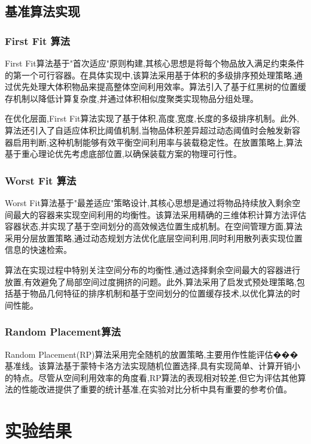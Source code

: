 \documentclass[UTF8]{ctexart}
\begin{document}
\subsection{基准算法实现}

\subsubsection{First Fit 算法}

First Fit算法基于"首次适应"原则构建,其核心思想是将每个物品放入满足约束条件的第一个可行容器。在具体实现中,该算法采用基于体积的多级排序预处理策略,通过优先处理大体积物品来提高整体空间利用效率。算法引入了基于红黑树的位置缓存机制以降低计算复杂度,并通过体积相似度聚类实现物品分组处理。

在优化层面,First Fit算法实现了基于{体积,高度,宽度,长度}的多级排序机制。此外,算法还引入了自适应体积比阈值机制,当物品体积差异超过动态阈值时会触发新容器启用判断,这种机制能够有效平衡空间利用率与装载稳定性。在放置策略上,算法基于重心理论优先考虑底部位置,以确保装载方案的物理可行性。

\subsubsection{Worst Fit 算法}

Worst Fit算法基于"最差适应"策略设计,其核心思想是通过将物品持续放入剩余空间最大的容器来实现空间利用的均衡性。该算法采用精确的三维体积计算方法评估容器状态,并实现了基于空间划分的高效候选位置生成机制。在空间管理方面,算法采用分层放置策略,通过动态规划方法优化底层空间利用,同时利用散列表实现位置信息的快速检索。

算法在实现过程中特别关注空间分布的均衡性,通过选择剩余空间最大的容器进行放置,有效避免了局部空间过度拥挤的问题。此外,算法采用了启发式预处理策略,包括基于物品几何特征的排序机制和基于空间划分的位置缓存技术,以优化算法的时间性能。

\subsubsection{Random Placement算法}

Random Placement(RP)算法采用完全随机的放置策略,主要用作性能评估���基准线。该算法基于蒙特卡洛方法实现随机位置选择,具有实现简单、计算开销小的特点。尽管从空间利用效率的角度看,RP算法的表现相对较差,但它为评估其他算法的性能改进提供了重要的统计基准,在实验对比分析中具有重要的参考价值。

\section{实验结果}
\end{document}
